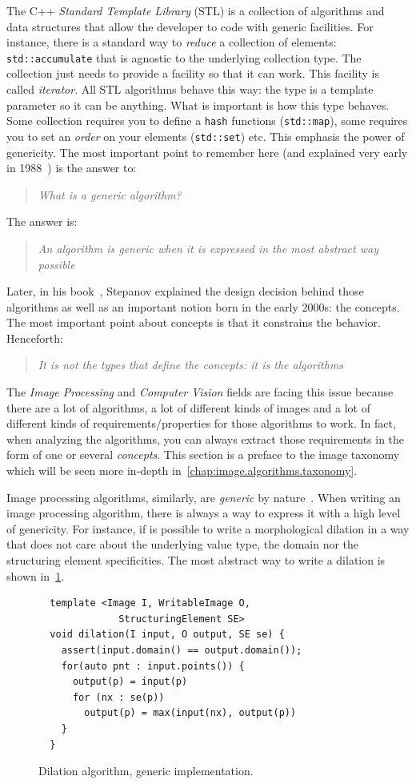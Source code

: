 The C++ \emph{Standard Template Library} (STL) is a collection of algorithms and data structures that allow the
developer to code with generic facilities. For instance, there is a standard way to \emph{reduce} a collection of
elements: \texttt{std::accumulate} that is agnostic to the underlying collection type. The collection just needs to
provide a facility so that it can work. This facility is called \emph{iterator}. All STL algorithms behave this way: the
type is a template parameter so it can be anything. What is important is how this type behaves. Some collection requires
you to define a \texttt{hash} functions (\texttt{std::map}), some requires you to set an \emph{order} on your elements
(\texttt{std::set}) etc. This emphasis the power of genericity. The most important point to remember here (and explained
very early in 1988~\cite{musser.1988.generic}) is the answer to: \blockquote{\emph{What is a generic algorithm?}}. The
answer is: \blockquote{\emph{An algorithm is generic when it is expressed in the most abstract way possible}}. Later, in
his book~\cite{stepanov.2009.elements}, Stepanov explained the design decision behind those algorithms as well as an
important notion born in the early 2000s: the concepts. The most important point about concepts is that it constrains
the behavior. Henceforth: \blockquote{\emph{It is not the types that define the concepts: it is the algorithms}}. The
\emph{Image Processing} and \emph{Computer Vision} fields are facing this issue because there are a lot of algorithms, a
lot of different kinds of images and a lot of different kinds of requirements/properties for those algorithms to work.
In fact, when analyzing the algorithms, you can always extract those requirements in the form of one or several
\emph{concepts}. This section is a preface to the image taxonomy which will be seen more in-depth
in~\cref{chap:image.algorithms.taxonomy}.

Image processing algorithms, similarly, are \emph{generic} by
nature~\cite{ritter.1990.cvgi,geraud.2000.icpr,darbon.2002.ismm,levillain.2010.icip,levillain.2014.ciarp}. When writing
an image processing algorithm, there is always a way to express it with a high level of genericity. For instance, if is
possible to write a morphological dilation in a way that does not care about the underlying value type, the domain nor
the structuring element specificities. The most abstract way to write a dilation is shown in~\ref{code:gen.dilate}.

\begin{figure}[htbp]
  \centering
  \begin{verbatim}
  template <Image I, WritableImage O,
              StructuringElement SE>
  void dilation(I input, O output, SE se) {
    assert(input.domain() == output.domain());
    for(auto pnt : input.points()) {
      output(p) = input(p)
      for (nx : se(p))
        output(p) = max(input(nx), output(p))
    }
  }
  \end{verbatim}
  \caption{Dilation algorithm, generic implementation.}
  \label{code:gen.dilate}
\end{figure}

